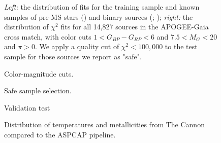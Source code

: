 \documentclass[modern]{aastex62}
\begin{document}
\begin{figure}[ht]
\caption{\textit{Left:} the distribution of fits for the training sample and known samples of pre-MS stars (\citealt{Cottaar:2014}) and binary sources (\citealt{ElBadry:2018}; \citealt{Skinner:2018}); \textit{right:} the distribution of $\chi^2$ fits for all 14,827 sources in the APOGEE-Gaia cross match, with color cuts $1<G_{BP}-G_{RP}<6$ and $7.5<M_{G}<20$ and $\pi>0$. We apply a quality cut of $\chi^2 < 100,000$ to the test sample for those sources we report as "safe". \label{fig:chi_dist}}
\end{figure}

\begin{figure}[ht]
\caption{Color-magnitude cuts.}
\end{figure}

\begin{figure}[ht]
\caption{Safe sample selection.}
\end{figure}

\begin{figure}[ht]
\caption{Validation test}
\caption{Distribution of temperatures and metallicities from The Cannon compared to the ASPCAP pipeline.}
\end{figure}



\end{document}
